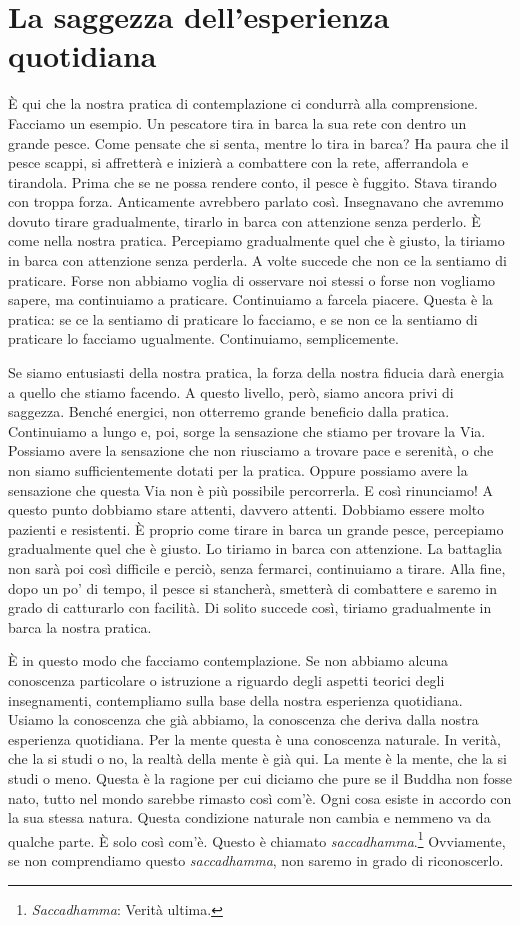 \section{La saggezza dell'esperienza quotidiana}

È qui che la nostra pratica di contemplazione ci condurrà alla
comprensione. Facciamo un esempio. Un pescatore tira in barca la sua
rete con dentro un grande pesce. Come pensate che si senta, mentre lo
tira in barca? Ha paura che il pesce scappi, si affretterà e inizierà a
combattere con la rete, afferrandola e tirandola. Prima che se ne possa
rendere conto, il pesce è fuggito. Stava tirando con troppa forza.
Anticamente avrebbero parlato così. Insegnavano che avremmo dovuto
tirare gradualmente, tirarlo in barca con attenzione senza perderlo. È
come nella nostra pratica. Percepiamo gradualmente quel che è giusto, la
tiriamo in barca con attenzione senza perderla. A volte succede che non
ce la sentiamo di praticare. Forse non abbiamo voglia di osservare noi
stessi o forse non vogliamo sapere, ma continuiamo a praticare.
Continuiamo a farcela piacere. Questa è la pratica: se ce la sentiamo di
praticare lo facciamo, e se non ce la sentiamo di praticare lo facciamo
ugualmente. Continuiamo, semplicemente.

Se siamo entusiasti della nostra pratica, la forza della nostra fiducia
darà energia a quello che stiamo facendo. A questo livello, però, siamo
ancora privi di saggezza. Benché energici, non otterremo grande
beneficio dalla pratica. Continuiamo a lungo e, poi, sorge la sensazione
che stiamo per trovare la Via. Possiamo avere la sensazione che non
riusciamo a trovare pace e serenità, o che non siamo sufficientemente
dotati per la pratica. Oppure possiamo avere la sensazione che questa
Via non è più possibile percorrerla. E così rinunciamo! A questo punto
dobbiamo stare attenti, davvero attenti. Dobbiamo essere molto pazienti
e resistenti. È proprio come tirare in barca un grande pesce, percepiamo
gradualmente quel che è giusto. Lo tiriamo in barca con attenzione. La
battaglia non sarà poi così difficile e perciò, senza fermarci,
continuiamo a tirare. Alla fine, dopo un po' di tempo, il pesce si
stancherà, smetterà di combattere e saremo in grado di catturarlo con
facilità. Di solito succede così, tiriamo gradualmente in barca la
nostra pratica.

È in questo modo che facciamo contemplazione. Se non abbiamo alcuna
conoscenza particolare o istruzione a riguardo degli aspetti teorici
degli insegnamenti, contempliamo sulla base della nostra esperienza
quotidiana. Usiamo la conoscenza che già abbiamo, la conoscenza che
deriva dalla nostra esperienza quotidiana. Per la mente questa è una
conoscenza naturale. In verità, che la si studi o no, la realtà della
mente è già qui. La mente è la mente, che la si studi o meno. Questa è
la ragione per cui diciamo che pure se il Buddha non fosse nato, tutto
nel mondo sarebbe rimasto così com'è. Ogni cosa esiste in accordo con la
sua stessa natura. Questa condizione naturale non cambia e nemmeno va da
qualche parte. È solo così com'è. Questo è chiamato
\emph{saccadhamma}.\footnote{\emph{Saccadhamma}: Verità ultima.}
Ovviamente, se non comprendiamo questo \emph{saccadhamma}, non saremo in
grado di riconoscerlo.

